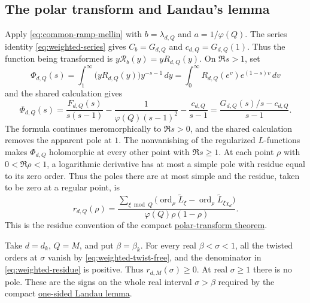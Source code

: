 \subsection*{The polar transform and Landau's lemma}

%
Apply \eqref{eq:common-ramp-mellin} with \(b=\lambda_{d,Q}\) and
\(a=1/\varphi(Q)\). The series identity \eqref{eq:weighted-series} gives
\(C_b=G_{d,Q}\) and \(c_{d,Q}=G_{d,Q}(1)\). Thus the function being
transformed is \(y\mathcal R_b(y)=yR_{d,Q}(y)\).
On \(\Re s>1\), set
\[
 \Phi_{d,Q}(s)=\int_1^\infty \bigl(yR_{d,Q}(y)\bigr)y^{-s-1}\,dy
 =\int_0^\infty R_{d,Q}(e^v)e^{(1-s)v}\,dv
\]
and the shared calculation gives
\begin{equation}\label{eq:weighted-polar}
 \Phi_{d,Q}(s)=\frac{F_{d,Q}(s)}{s(s-1)}
   -\frac{1}{\varphi(Q)(s-1)^2}-\frac{c_{d,Q}}{s-1}
   =\frac{G_{d,Q}(s)/s-c_{d,Q}}{s-1}.
\end{equation}
The formula continues meromorphically to \(\Re s>0\), and the shared
calculation removes the apparent pole at \(1\). The nonvanishing of the
regularized \(L\)-functions makes \(\Phi_{d,Q}\) holomorphic at every other
point with \(\Re s\ge1\). At each point
\(\rho\) with \(0<\Re\rho<1\), a logarithmic derivative has at most a
simple pole with residue equal to its zero order. Thus the poles there
are at most simple and the residue, taken to be zero at a regular point,
is
\begin{equation}\label{eq:weighted-residue}
 r_{d,Q}(\rho)=
 \frac{\displaystyle\sum_{\xi\bmod Q}
       \bigl(\operatorname{ord}_\rho\widetilde L_\xi-
             \operatorname{ord}_\rho\widetilde L_{\xi\chi_d}\bigr)}
      {\varphi(Q)\rho(1-\rho)}.
\end{equation}
This is the residue convention of the compact
\href{https://github.com/lsernau/grh-lean/blob/72fead102f663d5c7a407964a13dc0cf9d977207/grh-compact/src/New/Endgame/PrimeError.lean\#L66-L90}{polar-transform theorem}.

%
Take \(d=d_k\), \(Q=M\), and put \(\beta=\beta_k\). For every real
\(\beta<\sigma<1\), all the twisted orders at \(\sigma\) vanish by
\eqref{eq:weighted-twist-free}, and the denominator in
\eqref{eq:weighted-residue} is positive. Thus \(r_{d,M}(\sigma)\ge0\).
At real \(\sigma\ge1\) there is no pole. These are the signs on the whole
real interval \(\sigma>\beta\) required by the compact
\href{https://github.com/lsernau/grh-lean/blob/72fead102f663d5c7a407964a13dc0cf9d977207/grh-compact/src/Lib/Analytic/Landau/PolarLandau.lean\#L84-L123}{one-sided Landau lemma}.

